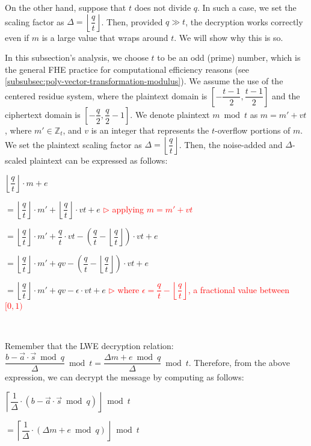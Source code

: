 On the other hand, suppose that $t$ does not divide $q$. In such a case, we set the scaling factor as $\Delta = \left\lfloor\dfrac{q}{t}\right\rfloor$. 
Then, provided $q \gg t$, the decryption works correctly even if $m$ is a large value that wraps around $t$. We will show why this is so. 

In this subsection's analysis, we choose $t$ to be an odd (prime) number, which is the general FHE practice for computational efficiency reasons (see \autoref{subsubsec:poly-vector-transformation-modulus}). 
We assume the use of the centered residue system, where the plaintext domain is $\left[-\dfrac{t-1}{2}, \dfrac{t-1}{2}\right]$ and the ciphertext domain is $\left[-\dfrac{q}{2}, \dfrac{q}{2} - 1\right]$.
We denote plaintext $m \bmod t$ as $m = m' + vt$, where $m' \in \mathbb{Z}_t$, and $v$ is an integer that represents the $t$-overflow portions of $m$. We set the plaintext scaling factor as $\Delta = \left\lfloor\dfrac{q}{t}\right\rfloor$. Then, the noise-added and $\Delta$-scaled plaintext can be expressed as follows:

$\left\lfloor\dfrac{q}{t}\right\rfloor\cdot m + e $

$= \left\lfloor\dfrac{q}{t}\right\rfloor\cdot m' + \left\lfloor\dfrac{q}{t}\right\rfloor\cdot vt + e$   \textcolor{red}{ $\rhd$ applying $m = m' + vt$}

$= \left\lfloor\dfrac{q}{t}\right\rfloor\cdot m' + \dfrac{q}{t}\cdot vt - \left(\dfrac{q}{t} - \left\lfloor\dfrac{q}{t}\right\rfloor\right)\cdot vt + e$  

$= \left\lfloor\dfrac{q}{t}\right\rfloor\cdot m' + qv - \left(\dfrac{q}{t} - \left\lfloor\dfrac{q}{t}\right\rfloor\right)\cdot vt + e$

$= \left\lfloor\dfrac{q}{t}\right\rfloor\cdot m' + qv - \epsilon \cdot vt + e$ \textcolor{red}{ $\rhd$ where $\epsilon = \dfrac{q}{t} - \left\lfloor\dfrac{q}{t}\right\rfloor$, a fractional value between $[0, 1)$}

$ $

Remember that the LWE decryption relation: $\dfrac{b - \vec{a}\cdot \vec{s} \bmod q}{\Delta} \bmod t = \dfrac{\Delta m + e \bmod q}{\Delta} \bmod t$. Therefore, from the above expression, we can decrypt the message by computing as follows:



$\left\lceil\dfrac{1}{\Delta} \cdot \left(b - \vec{a}\cdot\vec{s} \bmod q\right)\right\rfloor \bmod t$

$= \left\lceil\dfrac{1}{\Delta} \cdot \left(\Delta m + e \bmod q\right)\right\rfloor \bmod t$


